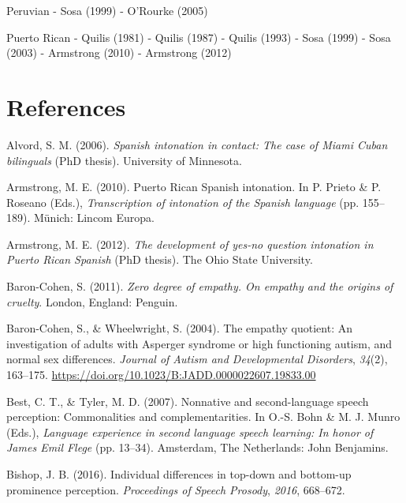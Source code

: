 \documentclass[]{article}
\newlength{\cslhangindent}
\newenvironment{CSLReferences}[2] %
 {%
  \setlength{\parindent}{0pt}
  \ifodd #1 \everypar{\setlength{\hangindent}{\cslhangindent}}\ignorespaces\fi
  \ifnum #2 > 0
  \setlength{\parskip}{#2\baselineskip}
  \fi
 }%
 {}
\begin{document}
Peruvian
- Sosa (1999)
- O'Rourke (2005)

Puerto Rican
- Quilis (1981)
- Quilis (1987)
- Quilis (1993)
- Sosa (1999)
- Sosa (2003)
- Armstrong (2010)
- Armstrong (2012)

\newpage

\hypertarget{references}{%
\section{References}\label{references}}

\hypertarget{refs}{}
\begin{CSLReferences}{1}{0}
\leavevmode{}%
Alvord, S. M. (2006). \emph{Spanish intonation in contact: The case of {M}iami {C}uban bilinguals} (PhD thesis). University of Minnesota.

\leavevmode{}%
Armstrong, M. E. (2010). Puerto {R}ican {S}panish intonation. In P. Prieto \& P. Roseano (Eds.), \emph{Transcription of intonation of the {S}panish language} (pp. 155--189). Münich: Lincom Europa.

\leavevmode{}%
Armstrong, M. E. (2012). \emph{The development of yes-no question intonation in {P}uerto {R}ican {S}panish} (PhD thesis). The Ohio State University.

\leavevmode{}%
Baron-Cohen, S. (2011). \emph{Zero degree of empathy. On empathy and the origins of cruelty}. London, England: Penguin.

\leavevmode{}%
Baron-Cohen, S., \& Wheelwright, S. (2004). The empathy quotient: An investigation of adults with {A}sperger syndrome or high functioning autism, and normal sex differences. \emph{Journal of Autism and Developmental Disorders}, \emph{34}(2), 163--175. \url{https://doi.org/10.1023/B:JADD.0000022607.19833.00}

\leavevmode{}%
Best, C. T., \& Tyler, M. D. (2007). Nonnative and second-language speech perception: {C}ommonalities and complementarities. In O.-S. Bohn \& M. J. Munro (Eds.), \emph{Language experience in second language speech learning: {I}n honor of {James Emil Flege}} (pp. 13--34). Amsterdam, The Netherlands: John Benjamins.

\leavevmode{}%
Bishop, J. B. (2016). Individual differences in top-down and bottom-up prominence perception. \emph{Proceedings of Speech Prosody}, \emph{2016}, 668--672.


\end{CSLReferences}
\end{document}
